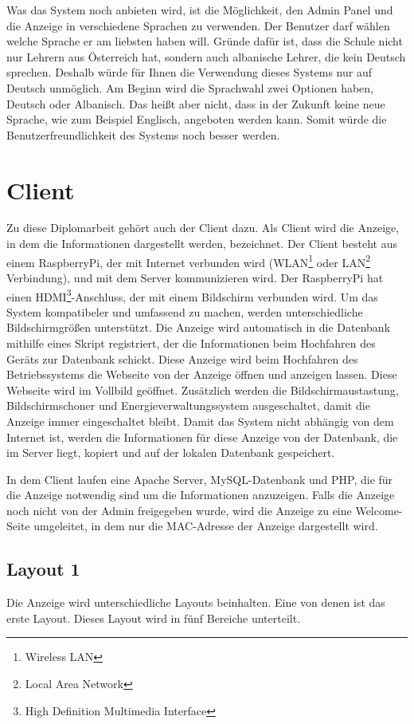 Was das System noch anbieten wird, ist die Möglichkeit, den Admin Panel und die Anzeige in verschiedene Sprachen zu verwenden. Der Benutzer darf wählen welche Sprache er am liebsten haben will. Gründe dafür ist, dass die Schule nicht nur Lehrern aus Österreich hat, sondern auch albanische Lehrer, die kein Deutsch sprechen. Deshalb würde für Ihnen die Verwendung dieses Systems nur auf Deutsch unmöglich. Am Beginn wird die Sprachwahl zwei Optionen haben, Deutsch oder Albanisch. Das heißt aber nicht, dass in der Zukunft keine neue Sprache, wie zum Beispiel Englisch, angeboten werden kann. Somit würde die Benutzerfreundlichkeit des Systems noch besser werden.

\section{Client}

Zu diese Diplomarbeit geh\"{o}rt auch der Client dazu. Als Client wird die Anzeige, in dem die Informationen dargestellt werden, bezeichnet. Der Client besteht aus einem RaspberryPi, der mit Internet verbunden wird (WLAN\footnote{Wireless LAN} oder LAN\footnote{Local Area Network} Verbindung), und mit dem Server kommunizieren wird. Der RaspberryPi hat einen HDMI\footnote{High Definition Multimedia Interface}-Anschluss, der mit einem Bildschirm verbunden wird. Um das System kompatibeler und umfassend zu machen, werden unterschiedliche Bildschirmgr\"{o}\ss{}en unterst\"{u}tzt. Die Anzeige wird automatisch  in die Datenbank mithilfe eines Skript registriert, der die Informationen beim Hochfahren des Ger\"{a}ts zur Datenbank schickt. Diese Anzeige wird beim Hochfahren des Betriebssystems die Webseite von der Anzeige \"{o}ffnen und anzeigen lassen. Diese Webseite wird im Vollbild ge\"{o}ffnet. Zus\"{a}tzlich werden die Bildschirmaustastung, Bildschirmschoner und Energieverwaltungssystem ausgeschaltet, damit die Anzeige immer eingeschaltet bleibt. Damit das System nicht abh\"{a}ngig von dem Internet ist, werden die Informationen f\"{u}r diese Anzeige von der Datenbank, die im Server liegt, kopiert und auf der lokalen Datenbank gespeichert. 

In dem Client laufen eine Apache Server, MySQL-Datenbank und PHP, die f\"{u}r die Anzeige notwendig sind um die Informationen anzuzeigen. Falls die Anzeige noch nicht von der Admin freigegeben wurde, wird die Anzeige zu eine Welcome-Seite umgeleitet, in dem nur die MAC-Adresse der Anzeige dargestellt wird.

\subsection{Layout 1}
Die Anzeige wird unterschiedliche Layouts beinhalten. Eine von denen ist das erste Layout. Dieses Layout wird in fünf Bereiche unterteilt.

